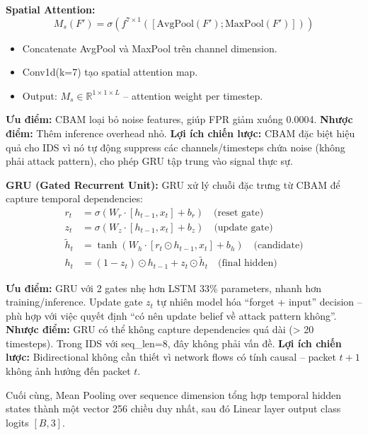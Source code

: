 \documentclass[12pt,a4paper]{article}
\begin{document}
\textbf{Spatial Attention:}
\begin{equation}
    M_s(F') = \sigma\left(f^{7\times 1}\left(\left[\text{AvgPool}(F'); \text{MaxPool}(F')\right]\right)\right)
\end{equation}
\begin{itemize}
    \item Concatenate AvgPool và MaxPool trên channel dimension.
    \item Conv1d(k=7) tạo spatial attention map.
    \item Output: $M_s \in \mathbb{R}^{1 \times 1 \times L}$ -- attention weight per timestep.
\end{itemize}

\textbf{Ưu điểm:} CBAM loại bỏ noise features, giúp FPR giảm xuống 0.0004. \textbf{Nhược điểm:} Thêm inference overhead nhỏ. \textbf{Lợi ích chiến lược:} CBAM đặc biệt hiệu quả cho IDS vì nó tự động suppress các channels/timesteps chứa noise (không phải attack pattern), cho phép GRU tập trung vào signal thực sự.

\textbf{GRU (Gated Recurrent Unit):} GRU xử lý chuỗi đặc trưng từ CBAM để capture temporal dependencies:
\begin{align}
    r_t &= \sigma(W_r \cdot [h_{t-1}, x_t] + b_r) \quad \text{(reset gate)} \label{eq:gru_reset} \\
    z_t &= \sigma(W_z \cdot [h_{t-1}, x_t] + b_z) \quad \text{(update gate)} \label{eq:gru_update} \\
    \tilde{h}_t &= \tanh(W_h \cdot [r_t \odot h_{t-1}, x_t] + b_h) \quad \text{(candidate)} \label{eq:gru_candidate} \\
    h_t &= (1 - z_t) \odot h_{t-1} + z_t \odot \tilde{h}_t \quad \text{(final hidden)} \label{eq:gru_hidden}
\end{align}

\textbf{Ưu điểm:} GRU với 2 gates nhẹ hơn LSTM 33\% parameters, nhanh hơn training/inference. Update gate $z_t$ tự nhiên model hóa ``forget + input'' decision -- phù hợp với việc quyết định ``có nên update belief về attack pattern không''. \textbf{Nhược điểm:} GRU có thể không capture dependencies quá dài (> 20 timesteps). Trong IDS với seq\_len=8, đây không phải vấn đề. \textbf{Lợi ích chiến lược:} Bidirectional không cần thiết vì network flows có tính causal -- packet $t+1$ không ảnh hưởng đến packet $t$.

Cuối cùng, Mean Pooling over sequence dimension tổng hợp temporal hidden states thành một vector 256 chiều duy nhất, sau đó Linear layer output class logits $[B, 3]$.
\end{document}
